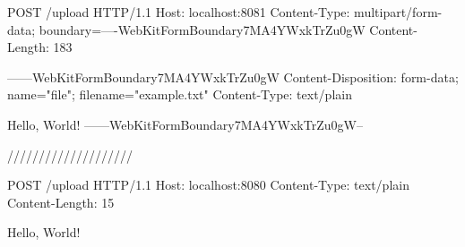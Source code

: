 POST /upload HTTP/1.1
Host: localhost:8081
Content-Type: multipart/form-data; boundary=----WebKitFormBoundary7MA4YWxkTrZu0gW
Content-Length: 183

------WebKitFormBoundary7MA4YWxkTrZu0gW
Content-Disposition: form-data; name="file"; filename="example.txt"
Content-Type: text/plain

Hello, World!
------WebKitFormBoundary7MA4YWxkTrZu0gW--



////////////////////



POST /upload HTTP/1.1
Host: localhost:8080
Content-Type: text/plain
Content-Length: 15

Hello, World!